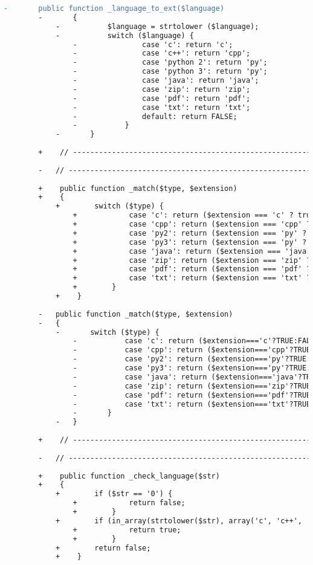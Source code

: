 \begin{lstlisting}[language=diff, caption=Perubahan pada kode Submit.php]
		-		public function _language_to_ext($language)
		-		{
			-			$language = strtolower ($language);
			-			switch ($language) {
				-				case 'c': return 'c';
				-				case 'c++': return 'cpp';
				-				case 'python 2': return 'py';
				-				case 'python 3': return 'py';
				-				case 'java': return 'java';
				-				case 'zip': return 'zip';
				-				case 'pdf': return 'pdf';
				-				case 'txt': return 'txt';
				-				default: return FALSE;
				-			}
			-		}
		
		+    // ------------------------------------------------------------------------
		
		-	// ------------------------------------------------------------------------
		
		+    public function _match($type, $extension)
		+    {
			+        switch ($type) {
				+            case 'c': return ($extension === 'c' ? true : false);
				+            case 'cpp': return ($extension === 'cpp' ? true : false);
				+            case 'py2': return ($extension === 'py' ? true : false);
				+            case 'py3': return ($extension === 'py' ? true : false);
				+            case 'java': return ($extension === 'java' ? true : false);
				+            case 'zip': return ($extension === 'zip' ? true : false);
				+            case 'pdf': return ($extension === 'pdf' ? true : false);
				+            case 'txt': return ($extension === 'txt' ? true : false);
				+        }
			+    }
		
		-	public function _match($type, $extension)
		-	{
			-		switch ($type) {
				-			case 'c': return ($extension==='c'?TRUE:FALSE);
				-			case 'cpp': return ($extension==='cpp'?TRUE:FALSE);
				-			case 'py2': return ($extension==='py'?TRUE:FALSE);
				-			case 'py3': return ($extension==='py'?TRUE:FALSE);
				-			case 'java': return ($extension==='java'?TRUE:FALSE);
				-			case 'zip': return ($extension==='zip'?TRUE:FALSE);
				-			case 'pdf': return ($extension==='pdf'?TRUE:FALSE);
				-			case 'txt': return ($extension==='txt'?TRUE:FALSE);
				-		}
			-	}
		
		+    // ------------------------------------------------------------------------
		
		-	// ------------------------------------------------------------------------
		
		+    public function _check_language($str)
		+    {
			+        if ($str == '0') {
				+            return false;
				+        }
			+        if (in_array(strtolower($str), array('c', 'c++', 'python 2', 'python 3', 'java', 'zip', 'pdf', 'txt'))) {
				+            return true;
				+        }
			+        return false;
			+    }
		

\end{lstlisting}
